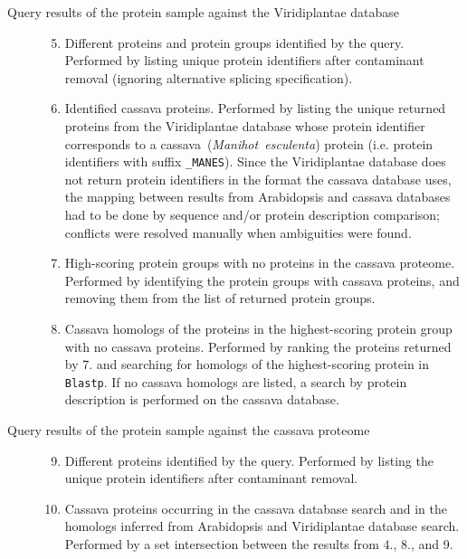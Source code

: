 \documentclass[oneside, a4paper, final]{memoir} %
\begin{document}
\begin{description}
\begin{description}
			\item[Query results of the protein sample against the Viridiplantae database]\hfill
				\begin{enumerate}
					\setcounter{enumi}{4}
					\item Dif{}ferent proteins and protein groups identif{}ied by the query.
					Performed by listing unique protein identif{}iers after contaminant removal (ignoring alternative splicing specif{}ication).
					\item Identif{}ied cassava proteins.
					Performed by listing the unique returned proteins from the Viridiplantae database whose protein identif{}ier corresponds to a
					cassava~(\emph{Manihot~esculenta}) protein	(i.e. protein identif{}iers with suf{}f{}ix \texttt{\_MANES}). Since the Viridiplantae database does not
					return protein identif{}iers in the format the cassava database uses, the mapping between results from Arabidopsis and cassava databases
					had to be done by sequence and/or protein description comparison; conflicts were resolved manually when ambiguities were found.
					\item High-scoring protein groups with no proteins in the cassava proteome. Performed by identifying the protein groups with cassava proteins, 
					and removing them from the list of returned protein groups.
					\item Cassava homologs of the proteins in the highest-scoring protein group with no cassava proteins. Performed by ranking the proteins returned by 7.
					and searching for homologs of the highest-scoring protein in \texttt{Blastp}. If no cassava homologs are listed, a search by protein description is performed
					on the cassava database.
				\end{enumerate}
			\item[Query results of the protein sample against the cassava proteome]\hfill
				\begin{enumerate}
					\setcounter{enumi}{8}
					\item Dif{}ferent proteins identif{}ied by the query.
						Performed by listing the unique protein identif{}iers after contaminant removal.
					\item Cassava proteins occurring in the cassava database search and in the homologs inferred from Arabidopsis and Viridiplantae database search.
						Performed by a set intersection between the results from 4., 8., and 9.
				\end{enumerate}			
		\end{description}
\end{description}
\end{document}
